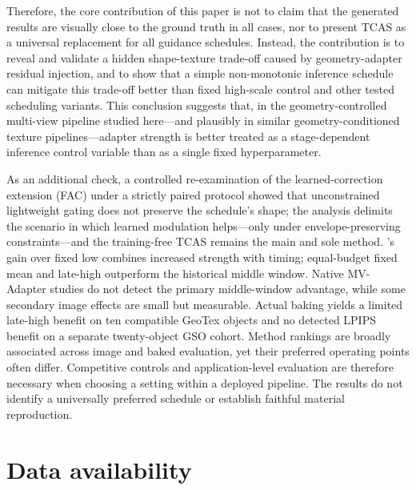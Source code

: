 \documentclass[times,twocolumn,final]{elsarticle}
\providecommand{\DIFadd}[1]{{\protect\color{blue} \sf #1}} %
\providecommand{\DIFdel}[1]{{\protect\color{red} \scriptsize #1}} %
\providecommand{\DIFaddbegin}{} %
\providecommand{\DIFaddend}{} %
\providecommand{\DIFdelend}{} %
\begin{document}
\DIFdel{Therefore, the core contribution of this paper is not to claim that the generated results are visually close to the ground truth in all cases, nor to present TCAS as a universal replacement for all guidance schedules. Instead, the contribution is to reveal and validate a hidden shape-texture trade-off caused by geometry-adapter residual injection, and to show that a simple non-monotonic inference schedule can mitigate this trade-off better than fixed high-scale control and other tested scheduling variants. This conclusion suggests that, in the geometry-controlled multi-view pipeline studied here---and plausibly in similar geometry-conditioned texture pipelines---adapter strength is better treated as a stage-dependent inference control variable than as a single fixed hyperparameter. }%

\DIFdel{As an additional check, a controlled re-examination of the learned-correction extension (FAC) under a strictly paired protocol showed that unconstrained lightweight gating does not preserve the schedule's shape; the analysis delimits the scenario in which learned modulation helps---only under envelope-preserving constraints---and the training-free TCAS remains the main and sole method. }\DIFdelend \DIFaddbegin \DIFadd{'s gain over fixed low combines increased strength with timing; equal-budget fixed mean and late-high outperform the historical middle window. Native MV-Adapter studies do not detect the primary middle-window advantage, while some secondary image effects are small but measurable. Actual baking yields a limited late-high benefit on ten compatible GeoTex objects and no detected LPIPS benefit on a separate twenty-object GSO cohort. Method rankings are broadly associated across image and baked evaluation, yet their preferred operating points often differ. Competitive controls and application-level evaluation are therefore necessary when choosing a setting within a deployed pipeline. The results do not identify a universally preferred schedule or establish faithful material reproduction.
}\DIFaddend 

\section*{Data availability}
\end{document}
